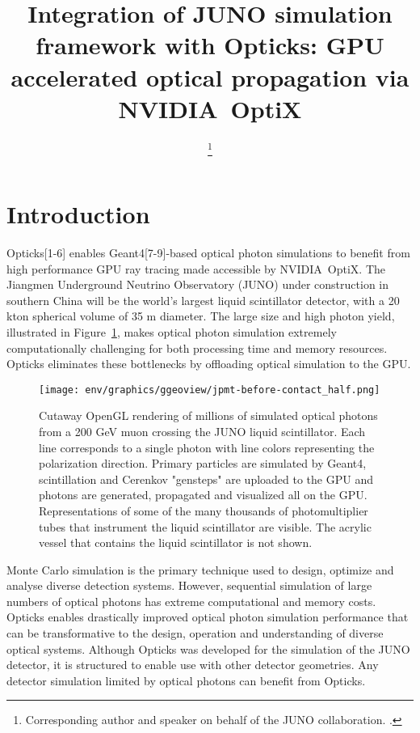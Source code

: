 \documentclass{webofc}
\begin{document}
%
\title{Integration of JUNO simulation framework with Opticks: GPU accelerated optical propagation via NVIDIA\textregistered\ OptiX\texttrademark}

\author{ \fnsep\thanks{Corresponding author and speaker on behalf of the JUNO collaboration. .}}



\abstract{%

}
%
\maketitle
%
%
\section{Introduction}%
\label{intro}
%
Opticks[1-6] enables Geant4[7-9]-based optical photon simulations 
to benefit from high performance GPU ray tracing made accessible 
by NVIDIA\textregistered\ OptiX\texttrademark[10-12].
%
The Jiangmen Underground Neutrino Observatory (JUNO)\cite{juno} 
under construction in southern China will be the world's largest liquid scintillator detector, 
with a 20 kton spherical volume of 35 m diameter. The large size and high photon yield, illustrated in Figure~\ref{problem}, 
makes optical photon simulation extremely computationally challenging for both processing time and memory resources. 
Opticks eliminates these bottlenecks by offloading optical simulation to the GPU. 
%

%
\begin{figure}
\centering
\texttt{[image: env/graphics/ggeoview/jpmt-before-contact\_half.png]}
\caption{Cutaway OpenGL rendering of millions of simulated optical photons from a 200 GeV muon crossing the JUNO liquid scintillator. 
Each line corresponds to a single photon with line colors representing the polarization direction. Primary particles
are simulated by Geant4, scintillation and Cerenkov "gensteps" are uploaded to the GPU and photons are generated, propagated
and visualized all on the GPU. Representations of some of the many thousands of photomultiplier tubes that instrument the liquid scintillator are visible.
The acrylic vessel that contains the liquid scintillator is not shown.
}
\label{problem}
\end{figure}%
%
Monte Carlo simulation is the primary technique used to design, optimize 
and analyse diverse detection systems. However, sequential simulation of large numbers of 
optical photons has extreme computational and memory costs. 
Opticks enables drastically improved optical photon simulation performance that can be transformative 
to the design, operation and understanding of diverse optical systems.
%
Although Opticks was developed for the simulation of the JUNO detector, it 
is structured to enable use with other detector geometries. 
Any detector simulation limited by optical photons 
can benefit from Opticks.
\end{document}
